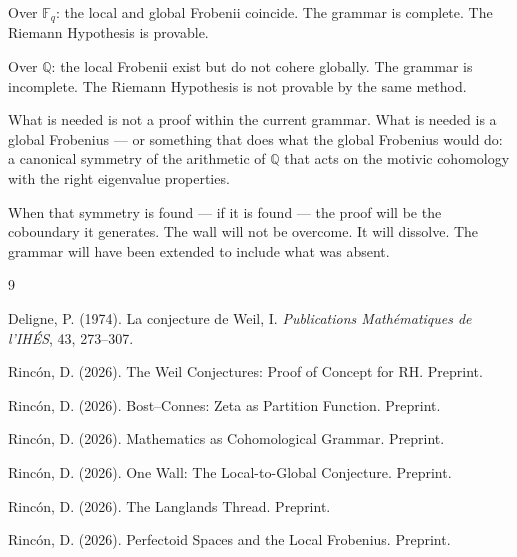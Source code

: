 \documentclass[12pt]{article}
\theoremstyle{definition}
\theoremstyle{remark}
\begin{document}
Over $\mathbb{F}_q$: the local and global Frobenii coincide.
The grammar is complete.
The Riemann Hypothesis is provable.

Over $\mathbb{Q}$: the local Frobenii exist but do not cohere globally.
The grammar is incomplete.
The Riemann Hypothesis is not provable by the same method.

What is needed is not a proof within the current grammar.
What is needed is a global Frobenius ---
or something that does what the global Frobenius would do:
a canonical symmetry of the arithmetic of $\mathbb{Q}$
that acts on the motivic cohomology with the right eigenvalue properties.

When that symmetry is found ---
if it is found ---
the proof will be the coboundary it generates.
The wall will not be overcome.
It will dissolve.
The grammar will have been extended to include what was absent.

\begin{thebibliography}{9}

Deligne, P. (1974).
La conjecture de Weil, I.
\textit{Publications Math\'ematiques de l'IH\'ES}, 43, 273--307.

Rinc\'on, D. (2026).
The Weil Conjectures: Proof of Concept for RH. Preprint.

Rinc\'on, D. (2026).
Bost--Connes: Zeta as Partition Function. Preprint.

Rinc\'on, D. (2026).
Mathematics as Cohomological Grammar. Preprint.

Rinc\'on, D. (2026).
One Wall: The Local-to-Global Conjecture. Preprint.

Rinc\'on, D. (2026).
The Langlands Thread. Preprint.

Rinc\'on, D. (2026).
Perfectoid Spaces and the Local Frobenius. Preprint.

\end{thebibliography}
\end{document}
